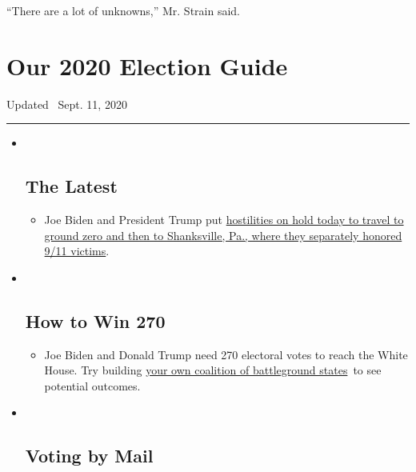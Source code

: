 ``There are a lot of unknowns,'' Mr. Strain said.

\hypertarget{our-2020-election-guide}{%
\section{Our 2020 Election Guide}\label{our-2020-election-guide}}

Updated ~Sept. 11, 2020

\begin{center}\rule{0.5\linewidth}{\linethickness}\end{center}

\begin{itemize}
\item ~
  \hypertarget{the-latest}{%
  \subsection{The Latest}\label{the-latest}}

  \begin{itemize}
  \item
    Joe Biden and President Trump put
    \href{https://www.nytimes3xbfgragh.onion/2020/09/11/us/politics/shanksville-trump-biden.html?action=click\&pgtype=Article\&state=default\&region=BELOW_MAIN_CONTENT\&context=storylines_guide}{hostilities
    on hold today to travel to ground zero and then to Shanksville, Pa.,
    where they separately honored 9/11 victims}.
  \end{itemize}
\item ~
  \hypertarget{how-to-win-270}{%
  \subsection{How to Win 270}\label{how-to-win-270}}

  \begin{itemize}
  \item
    Joe Biden and Donald Trump need 270 electoral votes to reach the
    White House. Try building
    \href{https://www.nytimes3xbfgragh.onion/interactive/2020/us/elections/election-states-biden-trump.html?action=click\&pgtype=Article\&state=default\&region=BELOW_MAIN_CONTENT\&context=storylines_guide}{your
    own coalition of battleground states}~to see potential outcomes.
  \end{itemize}
\item ~
  \hypertarget{voting-by-mail}{%
  \subsection{Voting by Mail}\label{voting-by-mail}}


\end{itemize}
